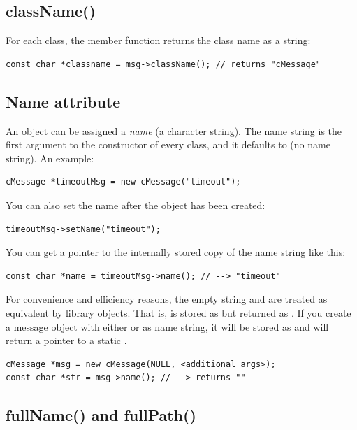 \subsection{className()}


For each class, the  member function returns the class
name as a string:

\begin{verbatim}
const char *classname = msg->className(); // returns "cMessage"
\end{verbatim}


\subsection{Name attribute}

An object can be assigned a \textit{name} (a character string). The name
string is the first argument to the constructor of every class,
and it defaults to  (no name string). An example:

\begin{verbatim}
cMessage *timeoutMsg = new cMessage("timeout");
\end{verbatim}

You can also set the name after the object has been created:

\begin{verbatim}
timeoutMsg->setName("timeout");
\end{verbatim}

You can get a pointer to the internally stored copy of the name
string like this:

\begin{verbatim}
const char *name = timeoutMsg->name(); // --> "timeout"
\end{verbatim}

For convenience and efficiency reasons, the empty string 
and  are treated as equivalent by library objects.
That is,  is stored as  but returned as .
If you create a message object with either 
or  as name string, it will be stored as 
and  will return a pointer to a static .

\begin{verbatim}
cMessage *msg = new cMessage(NULL, <additional args>);
const char *str = msg->name(); // --> returns ""
\end{verbatim}


\subsection{fullName() and fullPath()}


